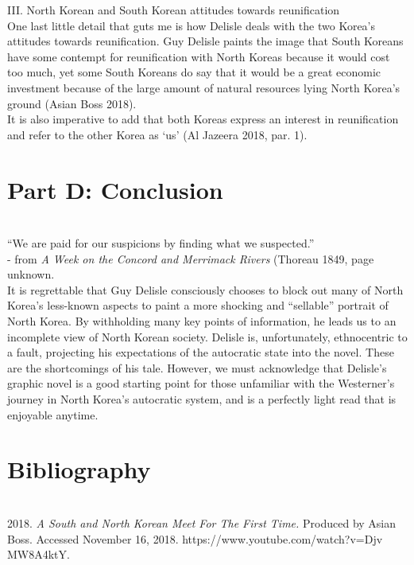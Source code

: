 \documentclass{article}
\begin{document}
III. North Korean and South Korean attitudes towards reunification \\

\qquad One last little detail that guts me is how Delisle deals with the two Korea’s attitudes towards reunification. Guy Delisle paints the image that South Koreans have some contempt for reunification with North Koreas because it would cost too much, yet some South Koreans do say that it would be a great economic investment because of the large amount of natural resources lying North Korea’s ground (Asian Boss 2018). \\

\qquad It is also imperative to add that both Koreas express an interest in reunification and refer to the other Korea as ‘us’ (Al Jazeera 2018, par. 1). \\

\section{Part D: Conclusion} \\

“We are paid for our suspicions by finding what we suspected.” \\
- from \textit{A Week on the Concord and Merrimack Rivers} (Thoreau 1849, page unknown. \\

\qquad It is regrettable that Guy Delisle consciously chooses to block out many of North Korea’s less-known aspects to paint a more shocking and “sellable” portrait of North Korea. By withholding many key points of information, he leads us to an incomplete view of North Korean society. Delisle is, unfortunately, ethnocentric to a fault, projecting his expectations of the autocratic state into the novel. These are the shortcomings of his tale. However, we must acknowledge that Delisle’s graphic novel is a good starting point for those unfamiliar with the Westerner’s journey in North Korea’s autocratic system, and is a perfectly light read that is enjoyable anytime. \\


\newpage

\section{Bibliography} 

\\ \hspace*{0.3cm} 2018. \textit{A South and North Korean Meet For The First Time.} Produced by  
\newline \hspace*{2cm} Asian Boss. Accessed November 16, 2018. https://www.youtube.com/watch?v=Djv \\
\hspace*{2cm} MW8A4ktY. \\
\end{document}
